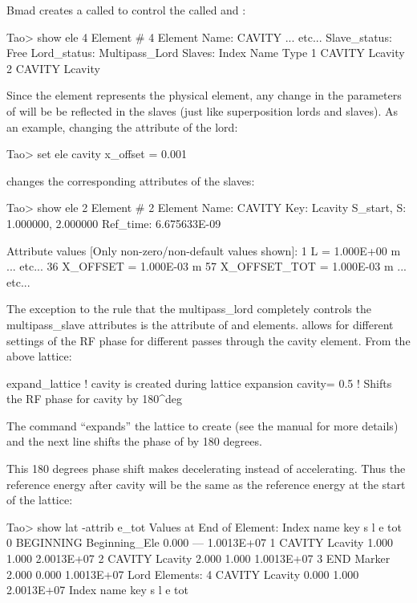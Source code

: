 \documentclass{hitec}     %
\begin{document}
Bmad creates a  called  to control the  called
 and :
\begin{code}
Tao> show ele 4
 Element #                4
 Element Name: CAVITY
... etc...
Slave_status: Free
Lord_status:  Multipass_Lord
Slaves:
   Index   Name        Type
       1   CAVITY\1    Lcavity
       2   CAVITY\2    Lcavity
\end{code}

Since the  element represents the physical element, any change in the parameters of 
will be be reflected in the slaves (just like superposition lords and slaves). As an example, changing
the attribute of the lord:
\begin{code}
Tao> set ele cavity x_offset = 0.001
\end{code}
changes the corresponding attributes of the slaves:
\begin{code}
Tao> show ele 2
 Element #                2
 Element Name: CAVITY\2
 Key: Lcavity
 S_start, S:    1.000000,    2.000000
 Ref_time:  6.675633E-09

 Attribute values [Only non-zero/non-default values shown]:
    1   L          =  1.000E+00 m
... etc...
   36   X_OFFSET   =  1.000E-03 m        57   X_OFFSET_TOT  =  1.000E-03 m
... etc...
\end{code}

The exception to the rule that the multipass_lord completely controls the multipass_slave attributes
is the  attribute of  and  elements. 
allows for different settings of the RF phase for different passes through the cavity element.
From the above lattice:
\begin{code}
expand_lattice                 ! cavity\2 is created during lattice expansion
cavity = 0.5 ! Shifts the RF phase for cavity\2 by 180^deg
\end{code}
The  command ``expands'' the lattice to create  (see the \bmad
manual for more details) and the next line shifts the phase of  by 180 degrees.

This 180 degrees phase shift makes  decelerating instead of accelerating. Thus the
reference energy after cavity  will be the same as the reference energy at the start
of the lattice:
\begin{code}
Tao> show lat -attrib e_tot
      Values at End of Element:
 Index  name      key                      s       l           e
                                                             tot
     0  BEGINNING Beginning_Ele        0.000     ---  1.0013E+07
     1  CAVITY\1  Lcavity              1.000   1.000  2.0013E+07
     2  CAVITY\2  Lcavity              2.000   1.000  1.0013E+07
     3  END       Marker               2.000   0.000  1.0013E+07
Lord Elements:
     4  CAVITY    Lcavity              0.000   1.000  2.0013E+07
 Index  name      key                      s       l           e
                                                             tot
\end{code}
\end{document}
